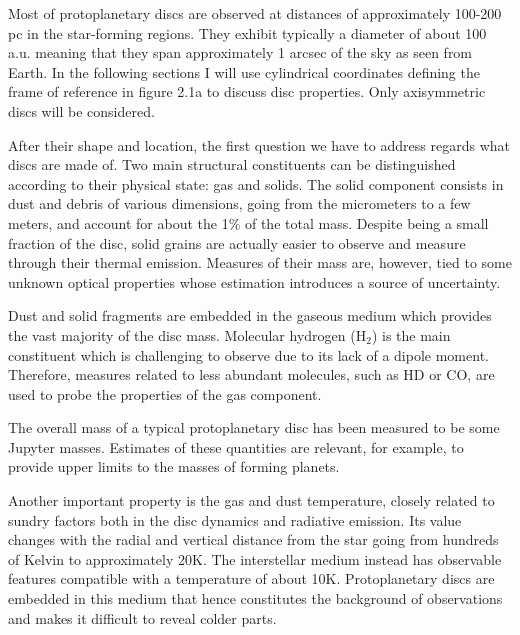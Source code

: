 \documentclass[a4paper,10pt]{report}
\begin{document}

Most of protoplanetary discs are observed at distances of approximately 100-200 pc in the star-forming regions. 
They exhibit typically a diameter of about 100 a.u. meaning that they span approximately
1 arcsec of the sky as seen from Earth.
In the following sections I will use cylindrical coordinates 
defining the frame of reference in figure 2.1a to discuss disc properties. Only axisymmetric discs will be considered.

After their shape and location, the first question we have to address regards what discs are made of.
Two main structural constituents can be distinguished according to their physical state: gas and solids.
The solid component consists in dust and debris of various dimensions, going from the micrometers to a few 
meters, and account for about the 1\% of the total mass. Despite being a small fraction of the disc, solid grains
are actually easier to observe and measure through their thermal emission. Measures of their mass are, however, tied to
some unknown optical properties whose estimation introduces a source of uncertainty.

Dust and solid fragments are embedded in the gaseous medium which provides the vast majority of the disc mass.
Molecular hydrogen (H$_2$) is the main constituent which is challenging to observe due to
its lack of a dipole moment. 
Therefore, measures related to less abundant molecules, such as HD or CO, are used to probe the properties of the gas component. 

The overall mass of a typical protoplanetary disc has been measured to be some Jupyter masses.
Estimates of these quantities are relevant, for example, to provide upper limits
to the masses of forming planets.

Another important property is the gas and dust temperature, closely related to sundry factors both in the disc dynamics and radiative emission.
Its value changes with the radial and vertical distance from the star going from hundreds of Kelvin to approximately 20K.
The interstellar medium instead has observable features compatible with a temperature of about 10K. Protoplanetary discs are embedded in this medium 
that hence constitutes the background of observations and makes it difficult to reveal colder parts.
\end{document}
